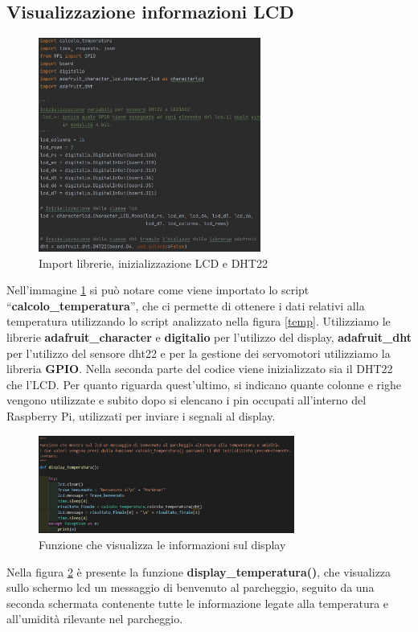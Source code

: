 \documentclass[a4paper,11pt]{report}
\begin{document}
\subsection{Visualizzazione informazioni LCD}
\begin{figure}[H]
	\centering
	\includegraphics[width=0.65\textwidth]{lcd_1}
	\caption{Import librerie, inizializzazione LCD e DHT22 }
	\label{lcd_in}
\end{figure}
Nell'immagine \ref{lcd_in} si può notare come viene importato lo script “\textbf{calcolo\_temperatura}”, che ci permette di ottenere i dati relativi alla temperatura utilizzando lo script analizzato nella figura \ref{temp}.
Utilizziamo le librerie \textbf{adafruit\_character} e \textbf{digitalio} per l’utilizzo del display, \textbf{adafruit\_dht} per l’utilizzo del sensore dht22 e per la gestione dei servomotori utilizziamo la libreria \textbf{GPIO}.
Nella seconda parte del codice viene inizializzato sia il DHT22 che l’LCD. Per quanto riguarda quest’ultimo, si indicano quante colonne e righe vengono utilizzate e subito dopo si elencano i pin occupati all’interno del Raspberry Pi, utilizzati per inviare i segnali al display.
\begin{figure}[H]
	\centering
	\includegraphics[width=0.75\textwidth]{lcd_2}
	\caption{Funzione che visualizza le informazioni sul display}
	\label{lcd_view}
\end{figure}
Nella figura \ref{lcd_view} è presente la funzione \textbf{display\_temperatura()}, che visualizza sullo schermo lcd un messaggio di benvenuto al parcheggio, seguito da una seconda schermata contenente tutte le informazione legate alla temperatura e all’umidità rilevante nel parcheggio.
\end{document}
